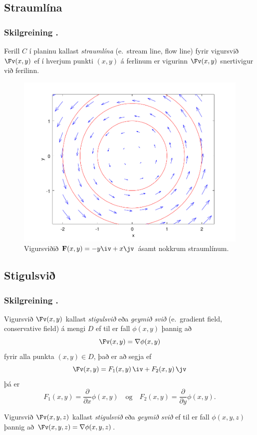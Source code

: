 \subsection{Straumlína} 

\subsubsection{Skilgreining \kaflanr.}
 Ferill $C$ í planinu kallast {\em straumlína}
(e.~stream line, flow line)
fyrir vigursvið $\Fv(x,y)$ ef í hverjum punkti $(x,y)$ á ferlinum er
vigurinn $\Fv(x,y)$ snertivigur við ferilinn. 


 \begin {figure}[h!]
 \centering
            \includegraphics[width=0.55\linewidth]{flowlines}
            \caption*{ Vigursviðið $\mathbf{F}(x,y) = -y\iv + x \jv$ ásamt nokkrum straumlínum.}
\end {figure}




\subsection{Stigulsvið} 

\subsubsection{Skilgreining \kaflanr.}
Vigursvið $\Fv(x,y)$ kallast {\em stigulsvið} eða {\em geymið svið}
(e.~gradient field, conservative  field) á mengi $D$ ef til er fall $\phi(x,y)$ þannig að $$\Fv(x,y)=\nabla\phi(x,y)$$ fyrir alla punkta $(x,y)\in D$, það er að segja ef 
$$\Fv(x,y)=F_1(x,y)\,\iv+F_2(x,y)\,\jv$$ þá er $$F_1(x,y)=\frac{\partial}{\partial x}\phi(x,y) \quad \text{og}\quad  F_2(x,y)=\frac{\partial}{\partial y}\phi(x,y).$$

Vigursvið $\Fv(x,y,z)$ kallast {\em stigulsvið} eða  {\em geymið svið} ef til er fall $\phi(x,y,z)$ þannig að $\Fv(x,y,z)=\nabla\phi(x,y,z)$. 

